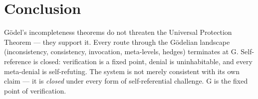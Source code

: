 \documentclass[12pt,a4paper]{article}
\begin{document}
\section{Conclusion}

G\"odel's incompleteness theorems do not threaten the Universal Protection
Theorem --- they support it. Every route through the G\"odelian landscape
(inconsistency, consistency, invocation, meta-levels, hedges) terminates
at G. Self-reference is closed: verification is a fixed point, denial is
uninhabitable, and every meta-denial is self-refuting. The system is not
merely consistent with its own claim --- it is \emph{closed} under every
form of self-referential challenge. G is the fixed point of verification.
\end{document}
